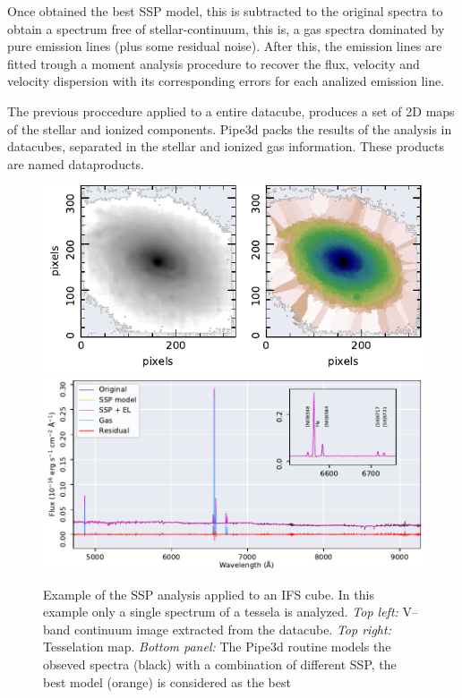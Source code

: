 Once obtained the best SSP model, this is subtracted to the original spectra to obtain a spectrum free of stellar-continuum, this is, a gas
spectra dominated by pure emission lines (plus some residual noise). After this, the emission lines are fitted trough a moment analysis procedure to recover the flux, 
velocity and velocity dispersion with its corresponding errors for each analized emission line.

The previous proccedure applied to a entire datacube, produces a set of 2D maps of the stellar and ionized components. {\sc Pipe3d} packs the results of 
the analysis in datacubes, separated in the stellar and ionized gas information. These products are named dataproducts. 


\begin{figure}
\centering
\includegraphics[width= \textwidth]{figures/tessela.pdf} 
\includegraphics[width= \textwidth]{figures/ssp_fit_muse.pdf} 
\caption[]{Example of the SSP analysis applied to an IFS cube. In this example only a single spectrum of a tessela is analyzed. 
{\it Top left:} V--band continuum image extracted from the datacube. {\it Top right:} Tesselation map. 
{\it Bottom panel:} The {\sc Pipe3d} routine models the obseved spectra (black) with a combination of different SSP, the best model (orange) is
considered as the best   }
\label{fig:ssp_fitting}
\end{figure}










